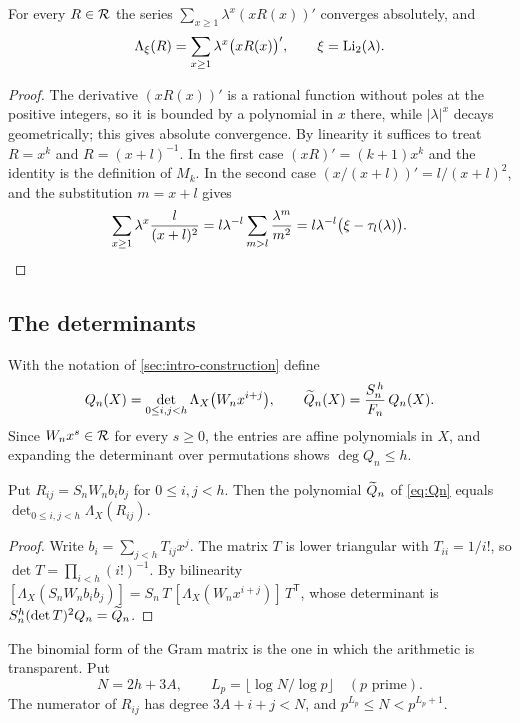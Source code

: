 \begin{lemma}\label{lem:series}
For every $R\in\mathcal{R}$ the series $\sum_{x\ge1}\lambda^x(xR(x))'$ converges absolutely, and
\[
\Lambda_\xi(R)=\sum_{x\ge1}\lambda^x\bigl(xR(x)\bigr)',\qquad \xi=\operatorname{Li}_2(\lambda).
\]
\end{lemma}

\begin{proof}
The derivative $(xR(x))'$ is a rational function without poles at the positive integers, so it is bounded by a polynomial in $x$ there, while $|\lambda|^x$ decays geometrically; this gives absolute convergence. By linearity it suffices to treat $R=x^k$ and $R=(x+l)^{-1}$. In the first case $(xR)'=(k+1)x^k$ and the identity is the definition of $M_k$. In the second case $(x/(x+l))'=l/(x+l)^2$, and the substitution $m=x+l$ gives
\[
\sum_{x\ge1}\lambda^x\frac{l}{(x+l)^2}=l\lambda^{-l}\sum_{m>l}\frac{\lambda^m}{m^2}=l\lambda^{-l}\bigl(\xi-\tau_l(\lambda)\bigr). \qedhere
\]
\end{proof}

\subsection{The determinants}\label{sec:determinants}
With the notation of \cref{sec:intro-construction} define
\begin{equation}\label{eq:Qn}
Q_n(X)=\det_{0\le i,j<h}\Lambda_X\bigl(W_nx^{i+j}\bigr),\qquad \widetilde{Q}_n(X)=\frac{S_n^{\,h}}{F_n}\,Q_n(X).
\end{equation}
Since $W_nx^s\in\mathcal{R}$ for every $s\ge0$, the entries are affine polynomials in $X$, and expanding the determinant over permutations shows $\deg Q_n\le h$.

\begin{lemma}\label{lem:normalization}
Put $R_{ij}=S_nW_nb_ib_j$ for $0\le i,j<h$. Then the polynomial $\widetilde{Q}_n$ of \eqref{eq:Qn} equals $\det_{0\le i,j<h}\Lambda_X(R_{ij})$.
\end{lemma}

\begin{proof}
Write $b_i=\sum_{j<h}T_{ij}x^j$. The matrix $T$ is lower triangular with $T_{ii}=1/i!$, so $\det T=\prod_{i<h}(i!)^{-1}$. By bilinearity $[\Lambda_X(S_nW_nb_ib_j)]=S_n\,T\,[\Lambda_X(W_nx^{i+j})]\,T^{\mathsf T}$, whose determinant is $S_n^h(\det T)^2Q_n=\widetilde{Q}_n$.
\end{proof}

The binomial form of the Gram matrix is the one in which the arithmetic is transparent. Put
\begin{equation}\label{eq:N-L}
N=2h+3A,\qquad L_p=\lfloor\log N/\log p\rfloor\quad(p\text{ prime}).
\end{equation}
The numerator of $R_{ij}$ has degree $3A+i+j<N$, and $p^{L_p}\le N<p^{L_p+1}$.

